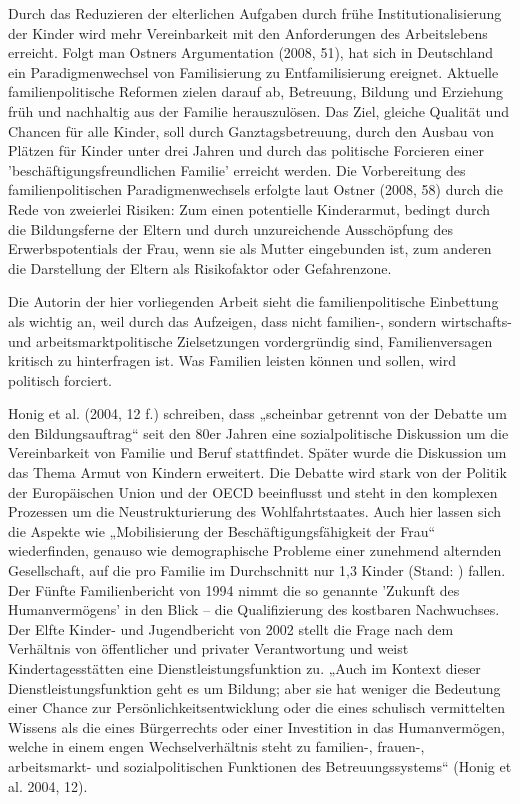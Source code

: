 Durch das Reduzieren der elterlichen Aufgaben durch frühe Institutionalisierung der Kinder wird mehr Vereinbarkeit mit den Anforderungen des Arbeitslebens erreicht. Folgt man Ostners Argumentation (2008, 51), hat sich in Deutschland ein Paradigmenwechsel von Familisierung zu Entfamilisierung ereignet. Aktuelle familienpolitische Reformen zielen darauf ab, Betreuung, Bildung und Erziehung früh und nachhaltig aus der Familie herauszulösen. Das Ziel, gleiche Qualität und Chancen für alle Kinder, soll durch Ganztagsbetreuung, durch den Ausbau von Plätzen für Kinder unter drei Jahren und durch das politische Forcieren einer 'beschäftigungsfreundlichen Familie' erreicht werden. Die Vorbereitung des familienpolitischen Paradigmenwechsels erfolgte laut Ostner (2008, 58) durch die Rede von zweierlei Risiken: Zum einen potentielle Kinderarmut, bedingt durch die Bildungsferne der Eltern und durch unzureichende Ausschöpfung des Erwerbspotentials der Frau, wenn sie als Mutter eingebunden ist, zum anderen die Darstellung der Eltern als Risikofaktor oder Gefahrenzone. 

Die Autorin der hier vorliegenden Arbeit sieht die familienpolitische Einbettung als wichtig an, weil durch das Aufzeigen, dass nicht familien-, sondern wirtschafts- und arbeitsmarktpolitische Zielsetzungen vordergründig sind, Familienversagen kritisch zu hinterfragen ist. Was Familien leisten können und sollen, wird politisch forciert.
 
Honig et al. (2004, 12 f.) schreiben, dass „scheinbar getrennt von der Debatte um den Bildungsauftrag“ seit den 80er Jahren eine sozialpolitische Diskussion um die Vereinbarkeit von Familie und Beruf stattfindet. Später wurde die Diskussion um das Thema Armut von Kindern erweitert. Die Debatte wird stark von der Politik der Europäischen Union und der OECD beeinflusst und steht in den komplexen Prozessen um die Neustrukturierung des Wohlfahrtstaates. Auch hier lassen sich die Aspekte wie „Mobilisierung der Beschäftigungsfähigkeit der Frau“ wiederfinden, genauso wie demographische Probleme einer zunehmend alternden Gesellschaft, auf die pro Familie im Durchschnitt nur 1,3 Kinder (Stand: ) fallen. Der Fünfte Familienbericht von 1994 nimmt die so genannte 'Zukunft des Humanvermögens' in den Blick -- die Qualifizierung des kostbaren Nachwuchses. Der Elfte Kinder- und Jugendbericht von 2002 stellt die Frage nach dem Verhältnis von öffentlicher und privater Verantwortung und weist Kindertagesstätten eine Dienstleistungsfunktion zu. „Auch im Kontext dieser Dienstleistungsfunktion geht es um Bildung; aber sie hat weniger die Bedeutung einer Chance zur Persönlichkeitsentwicklung oder die eines schulisch vermittelten Wissens als die eines Bürgerrechts oder einer Investition in das Humanvermögen, welche in einem engen Wechselverhältnis steht zu familien-, frauen-, arbeitsmarkt- und sozialpolitischen Funktionen des Betreuungssystems“ (Honig et al. 2004, 12).  
 
